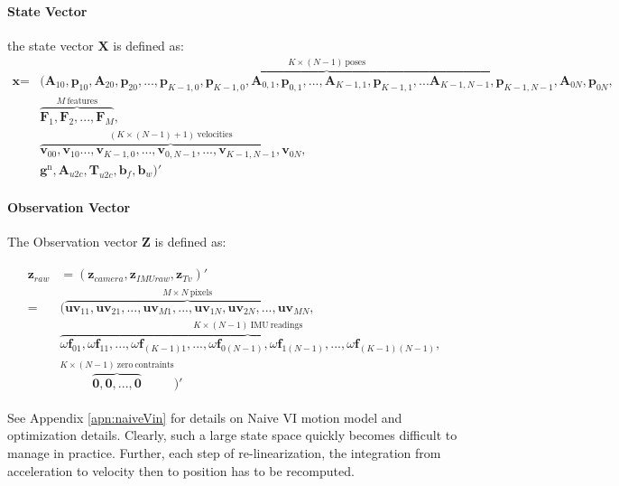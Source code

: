 \documentclass[12pt]{article}   %
\begin{document}
\paragraph{State Vector}
the state vector $\textbf{X}$ is defined as:
\begin{align*}
\textbf{x} = &(\overbrace{\textbf{A}_{10}, \textbf{p}_{10}, \textbf{A}_{20}, \textbf{p}_{20},... ,\textbf{p}_{K-1,0}, \textbf{p}_{K-1,0},\textbf{A}_{0,1}, \textbf{p}_{0,1},...,\textbf{A}_{K-1,1}, \textbf{p}_{K-1,1},... \textbf{A}_{K-1,N-1}, \textbf{p}_{K-1,N-1},\textbf{A}_{0N}, \textbf{p}_{0N}}^{K \times (N - 1) \ {\mathrm{ poses}}},\\
	 &\overbrace{\textbf{F}_{1},\textbf{F}_{2}, ..., \textbf{F}_{M}}^{M \ {\mathrm{ features}}},\\
	 &\overbrace{\textbf{v}_{00},\textbf{v}_{10} ...,\textbf{v}_{K-1,0}, ...,\textbf{v}_{0,N-1},...,\textbf{v}_{K-1,N-1}, \textbf{v}_{0N}}^{(K \times (N-1)+1)  \ {\mathrm{ velocities}}},\\
	 &\textbf{g}^{\mathrm{n}}, \textbf{A}_{u2c}, \textbf{T}_{u2c}, \textbf{b}_f, \textbf{b}_w )' 
\end{align*}

\paragraph{Observation Vector}
The Observation vector $\textbf{Z}$ is defined as:

\begin{align*}
\begin{split}
\textbf{z}_{raw} &= (\textbf{z}_{camera}, \textbf{z}_{IMUraw}, \textbf{z}_{Tv})' \nonumber \\
=& (\overbrace{\textbf{uv}_{11}, \textbf{uv}_{21}, ... , \textbf{uv}_{M1}, ..., \textbf{uv}_{1N}, \textbf{uv}_{2N}, ... , \textbf{uv}_{MN}}^{M \times N \ {\mathrm{pixels}}}, \nonumber \\ 
& \overbrace{\omega\textbf{f}_{01}, \omega\textbf{f}_{11}, ... , \omega\textbf{f}_{(K-1)1}, ..., \omega\textbf{f}_{0(N-1)}, \omega\textbf{f}_{1(N-1)}, ... , \omega\textbf{f}_{(K-1)(N-1)}}^{K \times (N-1) \ {\mathrm{IMU \ readings}}}, \\
& \overbrace{\textbf{0}, \textbf{0}, ... , \textbf{0}}^{K \times (N-1)  \ {\mathrm{ zero \ contraints}}})' 
\end{split}
\end{align*}

See Appendix \ref{apn:naiveVin} for details on Naive VI motion model and optimization details.
Clearly, such a large state space quickly becomes difficult to manage in practice. Further, each step of re-linearization, the integration from acceleration to velocity then to position has to be recomputed.
\end{document}
